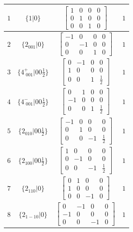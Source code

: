 \documentclass[fleqn,8pt]{jsarticle}
\begin{document}
\begin{longtable}{cccc}
$ 1 $ & $ \{1|0\} $ & $ \begin{bmatrix} 1 & 0 & 0 & 0 \\ 0 & 1 & 0 & 0 \\ 0 & 0 & 1 & 0 \end{bmatrix} $ & $ 1 $ \\ \hline
$ 2 $ & $ \{2{}_{001}|0\} $ & $ \begin{bmatrix} -1 & 0 & 0 & 0 \\ 0 & -1 & 0 & 0 \\ 0 & 0 & 1 & 0 \end{bmatrix} $ & $ 1 $ \\ \hline
$ 3 $ & $ \{4^{+}_{\,\,001}|0 0 \frac{1}{2}\} $ & $ \begin{bmatrix} 0 & -1 & 0 & 0 \\ 1 & 0 & 0 & 0 \\ 0 & 0 & 1 & \frac{1}{2} \end{bmatrix} $ & $ 1 $ \\ \hline
$ 4 $ & $ \{4^{-}_{\,\,001}|0 0 \frac{1}{2}\} $ & $ \begin{bmatrix} 0 & 1 & 0 & 0 \\ -1 & 0 & 0 & 0 \\ 0 & 0 & 1 & \frac{1}{2} \end{bmatrix} $ & $ 1 $ \\ \hline
$ 5 $ & $ \{2{}_{010}|0 0 \frac{1}{2}\} $ & $ \begin{bmatrix} -1 & 0 & 0 & 0 \\ 0 & 1 & 0 & 0 \\ 0 & 0 & -1 & \frac{1}{2} \end{bmatrix} $ & $ 1 $ \\ \hline
$ 6 $ & $ \{2{}_{100}|0 0 \frac{1}{2}\} $ & $ \begin{bmatrix} 1 & 0 & 0 & 0 \\ 0 & -1 & 0 & 0 \\ 0 & 0 & -1 & \frac{1}{2} \end{bmatrix} $ & $ 1 $ \\ \hline
$ 7 $ & $ \{2{}_{110}|0\} $ & $ \begin{bmatrix} 0 & 1 & 0 & 0 \\ 1 & 0 & 0 & 0 \\ 0 & 0 & -1 & 0 \end{bmatrix} $ & $ 1 $ \\ \hline
$ 8 $ & $ \{2{}_{1-10}|0\} $ & $ \begin{bmatrix} 0 & -1 & 0 & 0 \\ -1 & 0 & 0 & 0 \\ 0 & 0 & -1 & 0 \end{bmatrix} $ & $ 1 $ \\ \hline

\end{longtable}
\end{document}

